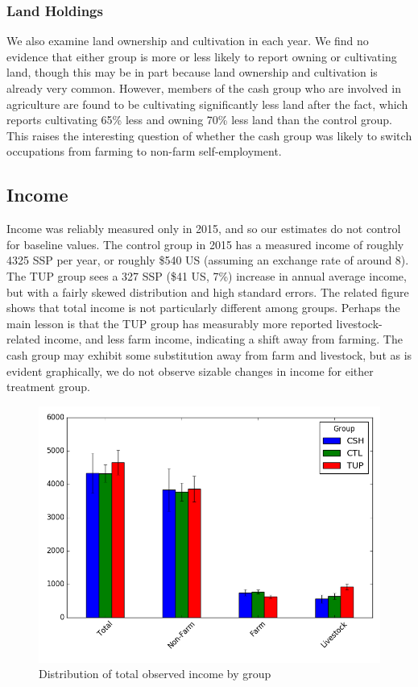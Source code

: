 \documentclass[12pt,article]{article}
\begin{document}
\subsubsection{Land Holdings}
\label{sec:orgheadline12}

We also examine land ownership and cultivation in each year. We find no evidence that
either group is more or less likely to report owning or cultivating land, though this
may be in part because land ownership and cultivation is already very common.
However, members of the cash group who are involved in agriculture are found to be
cultivating significantly less land after the fact, which reports cultivating 65\%
less and owning 70\% less land than the control group. This raises the interesting
question of whether the cash group was likely to switch occupations from farming to
non-farm self-employment.

\subsection{Income}
\label{sec:orgheadline14}

Income was reliably measured only in 2015, and so our estimates do not control for
baseline values. The control group in 2015 has a measured income of roughly 4325 SSP
per year, or roughly \$540 US (assuming an exchange rate of around 8). The TUP group
sees a 327 SSP (\$41 US, 7\%) increase in annual average income, but with a fairly
skewed distribution and high standard errors. The related figure shows that total
income is not particularly different among groups. Perhaps the main lesson is that
the TUP group has measurably more reported livestock-related income, and less farm
income, indicating a shift away from farming. The cash group may exhibit some
substitution away from farm and livestock, but as is evident graphically, we do not
observe sizable changes in income for either treatment group. 

\begin{figure}[htb]
\centering
\includegraphics[width=.9\linewidth]{../figures/Income_group.png}
\caption{\label{fig:orgparagraph2}
Distribution of total observed income by group}
\end{figure} 
\end{document}
